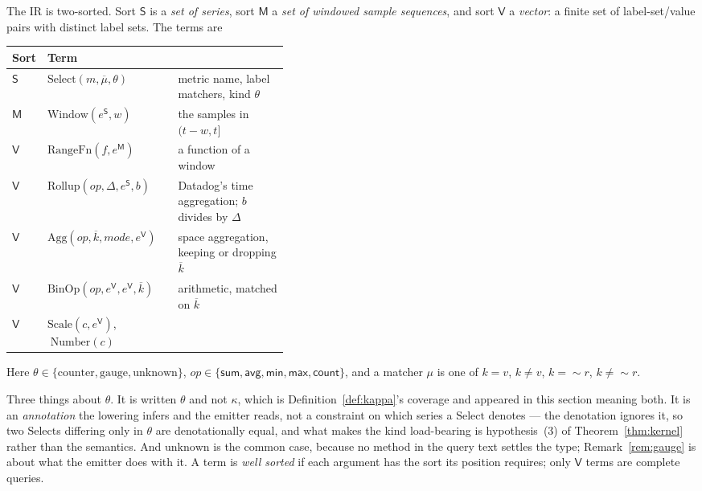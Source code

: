 \begin{definition}[IR]\label{def:ir}
The IR is two-sorted. Sort $\mathsf{S}$ is a \emph{set of series}, sort $\mathsf{M}$ a
\emph{set of windowed sample sequences}, and sort $\mathsf{V}$ a \emph{vector}: a finite
set of label-set/value pairs with distinct label sets. The terms are
\begin{center}\footnotesize
\begin{tabular}{@{}llp{0.40\linewidth}@{}}
\toprule
Sort & Term & \\
\midrule
$\mathsf{S}$ & $\mathrm{Select}(m,\overline{\mu},\theta)$
  & metric name, label matchers, kind $\theta$ \\
$\mathsf{M}$ & $\mathrm{Window}(e^{\mathsf{S}},w)$ & the samples in $(t-w,t]$ \\
$\mathsf{V}$ & $\mathrm{RangeFn}(f,e^{\mathsf{M}})$ & a function of a window \\
$\mathsf{V}$ & $\mathrm{Rollup}(\mathit{op},\Delta,e^{\mathsf{S}},b)$
  & Datadog's time aggregation; $b$ divides by $\Delta$ \\
$\mathsf{V}$ & $\mathrm{Agg}(\mathit{op},\overline{k},\mathit{mode},e^{\mathsf{V}})$
  & space aggregation, keeping or dropping $\overline{k}$ \\
$\mathsf{V}$ & $\mathrm{BinOp}(\mathit{op},e^{\mathsf{V}},e^{\mathsf{V}},\overline{k})$
  & arithmetic, matched on $\overline{k}$ \\
$\mathsf{V}$ & $\mathrm{Scale}(c,e^{\mathsf{V}})$, $\;\mathrm{Number}(c)$ & \\
\bottomrule
\end{tabular}
\end{center}
Here $\theta\in\{\text{counter},\text{gauge},\text{unknown}\}$,
$\mathit{op}\in\{\mathsf{sum},\mathsf{avg},\mathsf{min},\mathsf{max},\mathsf{count}\}$,
and a matcher $\mu$ is one of $k=v$, $k\neq v$, $k=\!\sim\! r$, $k\neq\!\sim\! r$.

Three things about $\theta$. It is written $\theta$ and not $\kappa$, which is
Definition~\ref{def:kappa}'s coverage and appeared in this section meaning both. It is an
\emph{annotation} the lowering infers and the emitter reads, not a constraint on which
series a $\mathrm{Select}$ denotes --- the denotation ignores it, so two
$\mathrm{Select}$s differing only in $\theta$ are denotationally equal, and what makes the
kind load-bearing is hypothesis~(3) of Theorem~\ref{thm:kernel} rather than the
semantics. And $\text{unknown}$ is the common case, because no method in the query text
settles the type; Remark~\ref{rem:gauge} is about what the emitter does with it.
A term is \emph{well sorted} if each argument has the sort its position requires; only
$\mathsf{V}$ terms are complete queries.
\end{definition}

